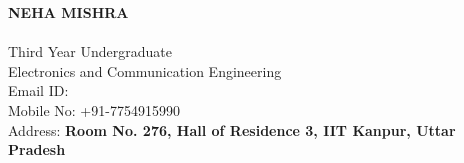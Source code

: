 \documentclass[letterpaper]{deedy-resume} %
\begin{document}


{\noindent\uppercase{\textbf{\LARGE{Neha Mishra}}}\\}
\\
\hspace{73pt}Third Year Undergraduate\\
\hspace{73pt}Electronics and Communication Engineering \\
\hspace{73pt} Email ID:  \\
Mobile No: +91-7754915990\\
Address: \textbf{Room No. 276, Hall of Residence 3, IIT Kanpur, Uttar Pradesh}\\
\microspace
\noindent\makebox[\linewidth]{\color{headings}\rule{\paperwidth}{0.6pt}} %
\vspace{-5pt}
\end{document}

